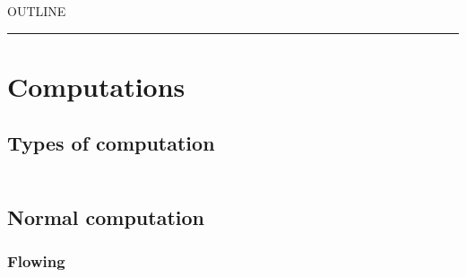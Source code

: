 


    OUTLINE
  \tableofcontents
\begin{center}
\rule{3in}{0.4pt}
\end{center}

\section{Computations}\hypertarget{computations}{}\label{computations}

\subsection{Types of computation}\hypertarget{types-of-computation}{}\label{types-of-computation}

\begin{align*}
  [ \
  \KEY{Funcon} \quad & \NAMEHYPER{../Computations}{Computation-Types}{computation-types}
  \ ]
\end{align*}
\subsection{Normal computation}\hypertarget{normal-computation}{}\label{normal-computation}

\subsubsection{Flowing}\hypertarget{flowing}{}\label{flowing}

